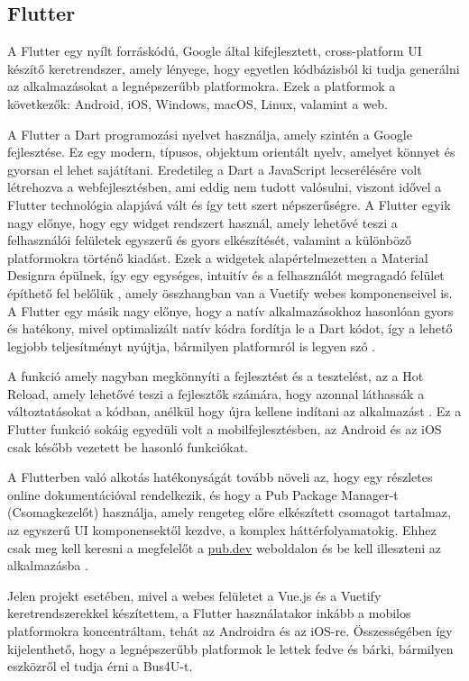 \subsection{Flutter}
A Flutter egy nyílt forráskódú, Google által kifejlesztett, cross-platform UI készítő keretrendszer, amely lényege, hogy egyetlen kódbázisból ki tudja generálni az alkalmazásokat a legnépszerűbb platformokra. Ezek a platformok a következők: Android, iOS, Windows, macOS, Linux, valamint a web.

A Flutter a Dart programozási nyelvet használja, amely szintén a Google fejlesztése. Ez egy modern, típusos, objektum orientált nyelv, amelyet könnyet és gyorsan el lehet sajátítani. Eredetileg a Dart a JavaScript lecserélésére volt létrehozva a webfejlesztésben, ami eddig nem tudott valósulni, viszont idővel a Flutter technológia alapjává vált és így tett szert népszerűségre. A Flutter egyik nagy előnye, hogy egy widget rendszert használ, amely lehetővé teszi a felhasználói felületek egyszerű és gyors elkészítését, valamint a különböző platformokra történő kiadást. Ezek a widgetek alapértelmezetten a Material Designra épülnek, így egy egységes, intuitív és a felhasználót megragadó felület építhető fel belőlük \cite{materialdesign}, amely összhangban van a Vuetify webes komponenseivel is. A Flutter egy másik nagy előnye, hogy a natív alkalmazásokhoz hasonlóan gyors és hatékony, mivel optimalizált natív kódra fordítja le a Dart kódot, így a lehető legjobb teljesítményt nyújtja, bármilyen platformról is legyen szó \cite{flutterinaction}.

A funkció amely nagyban megkönnyíti a fejlesztést és a tesztelést, az a Hot Reload, amely lehetővé teszi a fejlesztők számára, hogy azonnal láthassák a változtatásokat a kódban, anélkül hogy újra kellene indítani az alkalmazást \cite{flutterinaction}. Ez a Flutter funkció sokáig egyedüli volt a mobilfejlesztésben, az Android és az iOS csak később vezetett be hasonló funkciókat.

A Flutterben való alkotás hatékonyságát tovább növeli az, hogy egy részletes online dokumentációval rendelkezik, és hogy a Pub Package Manager-t (Csomagkezelőt) használja, amely rengeteg előre elkészített csomagot tartalmaz, az egyszerű UI komponensektől kezdve, a komplex háttérfolyamatokig. Ehhez csak meg kell keresni a megfelelőt a \url{pub.dev} weboldalon és be kell illeszteni az alkalmazásba \cite{flutterinaction}.

Jelen projekt esetében, mivel a webes felületet a Vue.js és a Vuetify keretrendszerekkel készítettem, a Flutter használatakor inkább a mobilos platformokra koncentráltam, tehát az Androidra és az iOS-re. Összességében így kijelenthető, hogy a legnépszerűbb platformok le lettek fedve és bárki, bármilyen eszközről el tudja érni a Bus4U-t.

